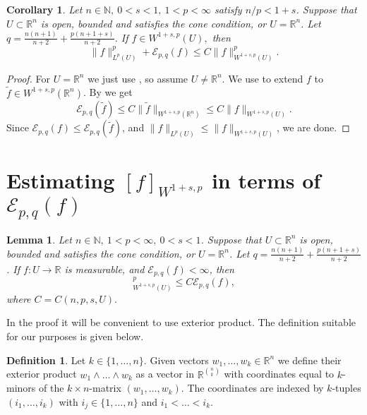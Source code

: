 \documentclass[11pt]{amsart}
\newcommand{\R}{\mathbb{R}}
\newcommand{\Epq}{\mathcal{E}_{p,q}}
\newtheorem{lemma}[theorem]{Lemma}
\newtheorem{cor}[theorem]{Corollary}
\theoremstyle{definition}
\newtheorem{defi}[theorem]{Definition}
\begin{document}
	\begin{cor}
		Let $n\in\mathbb{N},\ 0<s<1,\ 1<p<\infty$ satisfy $n/p<1+s$. Suppose that $U \subset\R^n$ is open, bounded and satisfies the cone condition, or $U=\R^n$. Let $q= \frac{n(n+1)}{n+2} + \frac{p(n+1+s)}{n+2}$. If $f\in W^{1+s,p}(U),$ then
		\begin{equation*}
		\lVert f\rVert_{L^p( U)}^p + \Epq(f)\le C\lVert f\rVert^p_{W^{1+s,p}(U)}.
		\end{equation*}
	\end{cor}
	\begin{proof}
		
		For $U=\R^n$ we just use , so assume $U\not=\R^n$. We use  to extend $f$ to $\tilde{f}\in W^{1+s,p}(\R^n)$. By  we get 
		\begin{equation*}
		\Epq(\tilde{f})\le C\lVert \tilde{f}\rVert_{W^{1+s,p}(\R^n)}\le C\lVert f\rVert_{W^{1+s,p}(U)}.
		\end{equation*}
		Since $\Epq(f)\le\Epq(\tilde{f})$, and $\lVert f\rVert_{L^p(U)}\le \lVert f\rVert_{W^{1+s,p}(U)}$, we are done.
		\end{proof}

\section{Estimating $[f]_{W^{1+s,p}}$ in terms of $\Epq(f)$}
	
	\begin{lemma}\label{lem:energy_implies_sobolev}
		Let $n\in\mathbb{N},\ 1<p<\infty,\ 0<s<1$. Suppose that $ U\subset\R^n$ is open, bounded and satisfies the cone condition, or $U=\R^n$. Let $q=\frac{n(n+1)}{n+2} + \frac{p(n+1+s)}{n+2}$. If $f: U\rightarrow\R$ is measurable, and $\mathcal{E}_{p,q}(f)<\infty$, then 
		\begin{equation*}
		[f]^p_{W^{1+s,p}( U)}\le C\Epq(f),
		\end{equation*}
		where $C=C(n,p,s,U).$
	\end{lemma}
	
	In the proof it will be convenient to use exterior product. The definition suitable for our purposes is given below.
	
	\begin{defi}
		Let $k\in\{1,\dots,n\}$. Given vectors $w_1,\dots,w_k\in\R^n$ we define their exterior product $w_1\wedge\dots\wedge w_k$ as a vector in $\R^{n\choose k}$ with coordinates equal to $k$-minors of the $k\times n$-matrix $(w_1,\dots,w_k)$. The coordinates are indexed by $k$-tuples $(i_1,\dots,i_k)$ with $i_j\in\{1,\dots,n\}$ and $i_1<\dots<i_k$.
	\end{defi}
	
\end{document}
